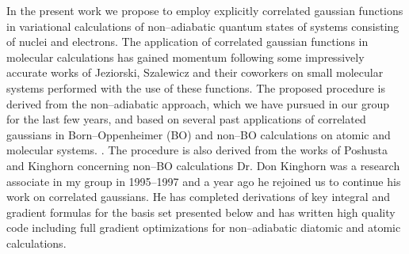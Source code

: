 In the present work we propose to employ explicitly correlated
gaussian functions in variational calculations of 
non--adiabatic quantum states of systems 
consisting of nuclei and electrons.
The application of correlated gaussian functions in
molecular calculations has gained momentum
following some impressively accurate 
works of Jeziorski, Szalewicz and
their coworkers on small molecular systems performed
with the use of these functions.
\cite{sz1}
The proposed procedure is derived from
the non--adiabatic approach, which we have pursued in our group
for the last few years, and based on several past applications
of correlated gaussians in Born--Oppenheimer (BO) 
and non--BO calculations on atomic
and molecular systems.
\cite{A2,A3,A6,A8,%
A14,%
A16,%
A20,A21,%
A27,%
A37,%
A38,A382,A383,%
kozlowski91,kozlowski92a,kozlowski92b,kozlowski92c}.
The procedure is also derived from the works 
of Poshusta and Kinghorn
concerning non--BO calculations
\cite{Poshusta83,Kinghorn93,Kinghorn95b}
Dr. Don Kinghorn was a research associate 
in my group in 1995--1997 and a year ago he 
rejoined us to continue his work on correlated
gaussians. He has completed derivations of key integral and
gradient formulas for the basis set presented below and has
written high quality code including full gradient optimizations 
for non--adiabatic diatomic and atomic calculations. 

